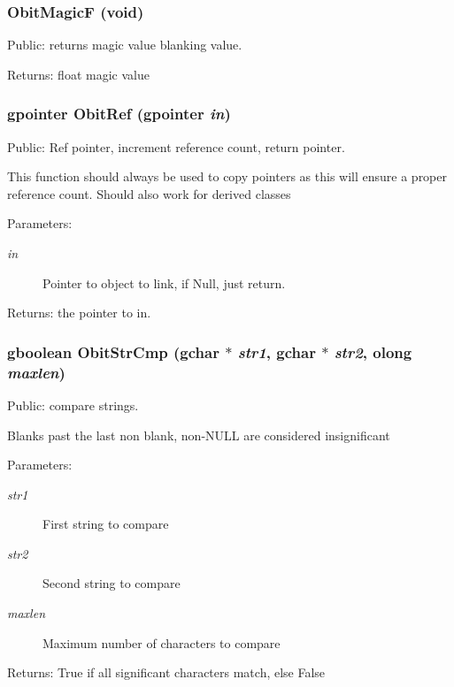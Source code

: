 \subsubsection{ Obit\-Magic\-F (void)}\label{Obit_8h_a21}


Public: returns magic value blanking value. 

\begin{Desc}
\item[Returns:]float magic value \end{Desc}
\subsubsection{\setlength{\rightskip}{0pt plus 5cm}gpointer Obit\-Ref (gpointer {\em in})}\label{Obit_8h_a18}


Public: Ref pointer, increment reference count, return pointer. 

This function should always be used to copy pointers as this will ensure a proper reference count. Should also work for derived classes \begin{Desc}
\item[Parameters:]
\begin{description}
\item[{\em in}]Pointer to object to link, if Null, just return. \end{description}
\end{Desc}
\begin{Desc}
\item[Returns:]the pointer to in. \end{Desc}
\subsubsection{\setlength{\rightskip}{0pt plus 5cm}gboolean Obit\-Str\-Cmp (gchar $\ast$ {\em str1}, gchar $\ast$ {\em str2}, {\bf olong} {\em maxlen})}\label{Obit_8h_a23}


Public: compare strings. 

Blanks past the last non blank, non-NULL are considered insignificant \begin{Desc}
\item[Parameters:]
\begin{description}
\item[{\em str1}]First string to compare \item[{\em str2}]Second string to compare \item[{\em maxlen}]Maximum number of characters to compare \end{description}
\end{Desc}
\begin{Desc}
\item[Returns:]True if all significant characters match, else False \end{Desc}
